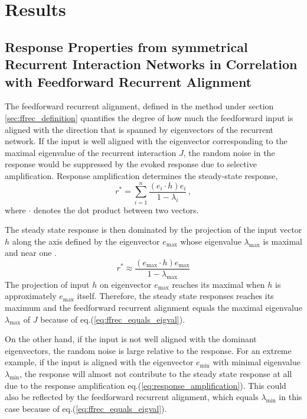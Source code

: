 \documentclass[11pt]{article}
\begin{document}
	\section{Results}
	
	\subsection{Response Properties from symmetrical Recurrent Interaction Networks in Correlation with Feedforward Recurrent Alignment} \label{sec:results_symmetric}
	The feedforward recurrent alignment, defined in the method under section \ref{sec:ffrec_definition} quantifies the degree of how much the feedforward input is aligned with the direction that is spanned by eigenvectors of the recurrent network. If the input is well aligned with the eigenvector corresponding to the maximal eigenvalue of the recurrent interaction $J$, the random noise in the response would be suppressed by the evoked response due to selective amplification. Response amplification determines the steady-state response, 
		\begin{equation} \label{eq:response_amplification}
			r^* = \sum_{i = 1}^{n} \frac{(e_i \cdot h) e_i}{1-\lambda_i} \, ,
		\end{equation}
	where $\cdot$ denotes the dot product between two vectors. 
	
	The steady state response is then dominated by the projection of the input vector $h$ along the axis defined by the eigenvector $e_{\text{max}}$ whose eigenvalue $\lambda_{\text{max}}$ is maximal and near one \cite{dayan2005theoretica}. 
		\begin{equation} \label{eq:selective_amplification}
			r^* \approx \frac{(e_{\text{max}} \cdot h) e_{\text{max}}}{1 - \lambda_{\text{max}}}
		\end{equation}
	The projection of input $h$ on eigenvector $e_{\text{max}}$ reaches its maximal when $h$ is approximately $e_{\text{max}}$ itself. Therefore, the steady state responses reaches its maximum and the feedforward recurrent alignment equals the maximal eigenvalue $\lambda_{\text{max}}$ of $J$ because of eq.(\ref{eq:ffrec_equals_eigval}). 
	
	On the other hand, if the input is not well aligned with the dominant eigenvectors, the random noise is large relative to the response. For an extreme example, if the input is aligned with the eigenvector $e_{\text{min}}$ with minimal eigenvalue $\lambda_{\text{min}}$, the response will almost not contribute to the steady state response at all due to the response amplification eq.(\ref{eq:response_amplification}). This could also be reflected by the feedforward recurrent alignment, which equals $\lambda_{\text{min}}$ in this case because of eq.(\ref{eq:ffrec_equals_eigval}). 
	
\end{document}

